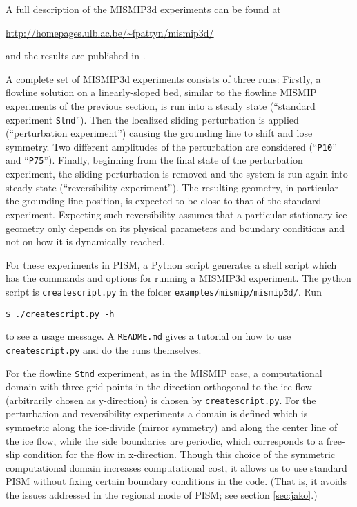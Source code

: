 A full description of the MISMIP3d experiments can be found at

\centerline{\url{http://homepages.ulb.ac.be/~fpattyn/mismip3d/}}

\noindent and the results are published in \cite{MISMIP3d2013}.

A complete set of MISMIP3d experiments consists of three runs: Firstly, a flowline solution on a linearly-sloped bed, similar to the flowline MISMIP experiments of the previous section, is run into a steady state (``standard experiment \texttt{Stnd}'').  Then the localized sliding perturbation is applied (``perturbation experiment'')  causing the grounding line to shift and lose symmetry.  Two different amplitudes of the perturbation are considered (``\texttt{P10}'' and ``\texttt{P75}'').  Finally, beginning from the final state of the perturbation experiment, the sliding perturbation is removed and the system is run again into steady state (``reversibility experiment'').  The resulting geometry, in particular the grounding line position, is expected to be close to that of the standard experiment.  Expecting such reversibility assumes that a particular stationary ice geometry only depends on its physical parameters and boundary conditions and not on how it is dynamically reached.

For these experiments in PISM, a Python script generates a shell script which has the commands and options for running a MISMIP3d experiment.  The python script is \texttt{createscript.py} in the folder \texttt{examples/mismip/mismip3d/}.  Run

\begin{verbatim}
$ ./createscript.py -h
\end{verbatim}

\noindent to see a usage message.  A \texttt{README.md} gives a tutorial on how to use \texttt{createscript.py} and do the runs themselves.

For the flowline \texttt{Stnd} experiment, as in the MISMIP case, a computational domain with three grid points in the direction orthogonal to the ice flow (arbitrarily chosen as y-direction) is chosen by \texttt{createscript.py}.  For the perturbation and reversibility experiments a domain is defined which is symmetric along the ice-divide (mirror symmetry) and along the center line of the ice flow, while the side boundaries are periodic, which corresponds to a free-slip condition for the flow in x-direction. Though this choice of the symmetric computational domain increases computational cost, it allows us to use standard PISM without fixing certain boundary conditions in the code.  (That is, it avoids the issues addressed in the regional mode of PISM; see section \ref{sec:jako}.)

